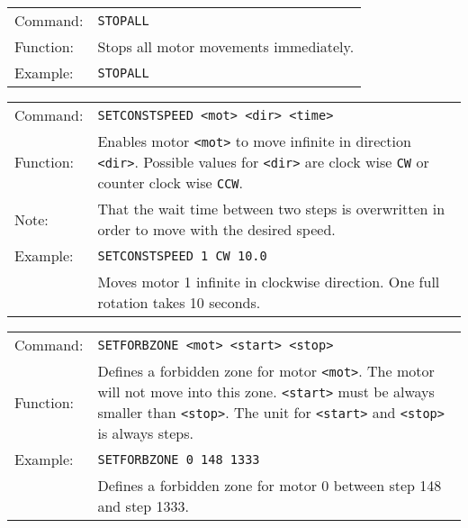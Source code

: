 \vspace{\vdistace}

\begin{table}[h]
  \begin{tabularx}{\textwidth}{lX}
    Command:  & \texttt{STOPALL}\\
    Function: & Stops all motor movements immediately.\\
    Example:  & \texttt{STOPALL}
  \end{tabularx}
\end{table}

\vspace{\vdistace}

\begin{table}[h]
  \begin{tabularx}{\textwidth}{lX}
    Command:  & \texttt{SETCONSTSPEED <mot> <dir> <time>}\\
    Function: & Enables motor \texttt{<mot>} to move infinite in direction \texttt{<dir>}.
                Possible values for \texttt{<dir>} are clock wise \texttt{CW} or
                counter clock wise \texttt{CCW}. \\
    Note:     & That the wait time between two steps is overwritten in order to move with the desired speed.\\
    Example:  & \texttt{SETCONSTSPEED 1 CW 10.0}\\
              & Moves motor 1 infinite in clockwise direction.
                One full rotation takes 10 seconds.
  \end{tabularx}
\end{table}

\vspace{\vdistace}

\begin{table}[h]
  \begin{tabularx}{\textwidth}{lX}
    Command:  & \texttt{SETFORBZONE <mot> <start> <stop>}\\
    Function: & Defines a forbidden zone for motor \texttt{<mot>}.
                The motor will not move into this zone. \texttt{<start>} must
                be always smaller than \texttt{<stop>}. The unit for \texttt{<start>}
                and \texttt{<stop>} is always steps.\\
    Example:  & \texttt{SETFORBZONE 0 148 1333}\\
              & Defines a forbidden zone for motor 0 between step 148 and step 1333.
  \end{tabularx}
\end{table}

